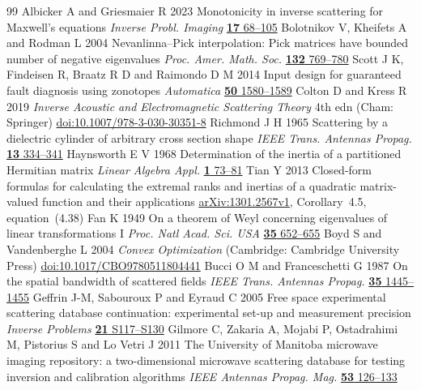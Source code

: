 \begin{thebibliography}{99}
 Albicker A and Griesmaier R 2023 Monotonicity in inverse scattering for Maxwell's equations \emph{Inverse Probl. Imaging} \href{https://doi.org/10.3934/ipi.2022032}{\textbf{17} 68--105}
 Bolotnikov V, Kheifets A and Rodman L 2004 Nevanlinna--Pick interpolation: Pick matrices have bounded number of negative eigenvalues \emph{Proc. Amer. Math. Soc.} \href{https://doi.org/10.1090/S0002-9939-03-07096-5}{\textbf{132} 769--780}
 Scott J K, Findeisen R, Braatz R D and Raimondo D M 2014 Input design for guaranteed fault diagnosis using zonotopes \emph{Automatica} \href{https://doi.org/10.1016/j.automatica.2014.03.016}{\textbf{50} 1580--1589}
 Colton D and Kress R 2019 \emph{Inverse Acoustic and Electromagnetic Scattering Theory} 4th edn (Cham: Springer) \href{https://doi.org/10.1007/978-3-030-30351-8}{doi:10.1007/978-3-030-30351-8}
 Richmond J H 1965 Scattering by a dielectric cylinder of arbitrary cross section shape \emph{IEEE Trans. Antennas Propag.} \href{https://doi.org/10.1109/TAP.1965.1138427}{\textbf{13} 334--341}
 Haynsworth E V 1968 Determination of the inertia of a partitioned Hermitian matrix \emph{Linear Algebra Appl.} \href{https://doi.org/10.1016/0024-3795(68)90050-5}{\textbf{1} 73--81}
 Tian Y 2013 Closed-form formulas for calculating the extremal ranks and inertias of a quadratic matrix-valued function and their applications \href{https://arxiv.org/abs/1301.2567v1}{arXiv:1301.2567v1}, Corollary~4.5, equation~(4.38)
 Fan K 1949 On a theorem of Weyl concerning eigenvalues of linear transformations I \emph{Proc. Natl Acad. Sci. USA} \href{https://doi.org/10.1073/pnas.35.11.652}{\textbf{35} 652--655}
 Boyd S and Vandenberghe L 2004 \emph{Convex Optimization} (Cambridge: Cambridge University Press) \href{https://doi.org/10.1017/CBO9780511804441}{doi:10.1017/CBO9780511804441}
 Bucci O M and Franceschetti G 1987 On the spatial bandwidth of scattered fields \emph{IEEE Trans. Antennas Propag.} \href{https://doi.org/10.1109/TAP.1987.1144024}{\textbf{35} 1445--1455}
 Geffrin J-M, Sabouroux P and Eyraud C 2005 Free space experimental scattering database continuation: experimental set-up and measurement precision \emph{Inverse Problems} \href{https://doi.org/10.1088/0266-5611/21/6/S09}{\textbf{21} S117--S130}
 Gilmore C, Zakaria A, Mojabi P, Ostadrahimi M, Pistorius S and Lo Vetri J 2011 The University of Manitoba microwave imaging repository: a two-dimensional microwave scattering database for testing inversion and calibration algorithms \emph{IEEE Antennas Propag. Mag.} \href{https://doi.org/10.1109/MAP.2011.6138442}{\textbf{53} 126--133}

\end{thebibliography}
